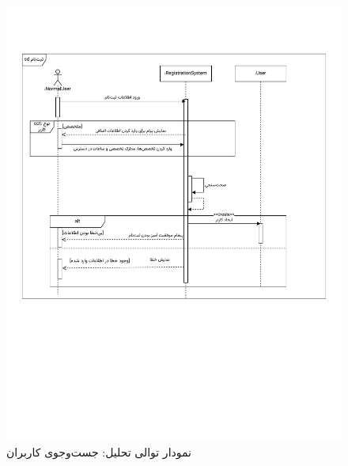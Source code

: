 \begin{figure}[ht!]
	\centering
	\includegraphics[scale=0.8, page=4]{figs/OOD-Sequence-1.pdf}
	\caption{نمودار توالی تحلیل: جست‌وجوی کاربران}
\end{figure}
\FloatBarrier
\newpage

